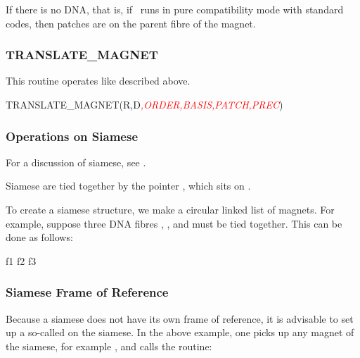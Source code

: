 If there is no DNA, that is, if \PTC\ runs in pure compatibility mode
with standard codes, then patches are on the parent fibre of the magnet.


\subsubsection*{TRANSLATE_MAGNET}

%
This routine operates like  described above.

\begin{ptccode}
TRANSLATE_MAGNET(R,D\textit{\textcolor{red}{,ORDER,BASIS,PATCH,PREC}})
\end{ptccode}


\subsubsection{Operations on Siamese}
\label{sec:ops.siamese}

For a discussion of siamese, see .

%
Siamese are tied together by the pointer , which
sits on .

%
To create a siamese structure, we make a circular linked list of magnets.
For example, suppose three DNA fibres , , and  must
be tied together. This can be done as follows:

\begin{ptccode}
f1%
f2%
f3%
\end{ptccode}


\subsubsection*{Siamese Frame of Reference}

%
Because a siamese does not have its own frame of reference, it is 
advisable to set up a so-called  on the siamese.
In the above example, one picks up any magnet of the siamese,
for example , and calls the routine:

